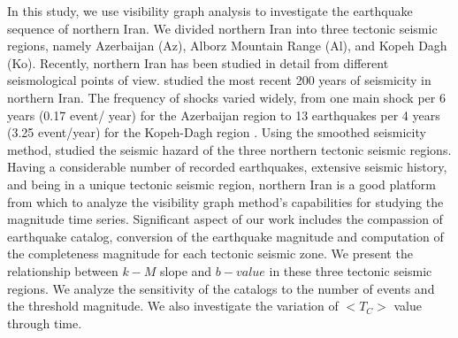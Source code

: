 In this study, we use visibility graph analysis to investigate the earthquake sequence of northern Iran. We divided northern Iran into three tectonic seismic regions, namely Azerbaijan (Az), Alborz Mountain Range (Al), and Kopeh Dagh (Ko).  Recently, northern Iran has been studied in detail from different seismological points of view.  \citet{Nemati2015} studied the most recent 200 years of seismicity in northern Iran. The frequency of shocks varied widely, from one main shock per 6 years (0.17 event/ year) for the Azerbaijan region to 13 earthquakes per 4 years (3.25 event/year) for the Kopeh-Dagh region \citep{Nemati2015}. Using the smoothed seismicity method, \citet{Khoshnevis2016} studied the seismic hazard of the three northern tectonic seismic regions. Having a considerable number of recorded earthquakes, extensive seismic history, and being in a unique tectonic seismic region, northern Iran is a good platform from which to analyze the visibility graph method's capabilities for studying the magnitude time series. Significant aspect of our work includes the compassion of earthquake catalog, conversion of the earthquake magnitude and computation of the completeness magnitude for each tectonic seismic zone. We present the relationship between  $k-M$  slope and $b-value$  in these three tectonic seismic regions. We analyze the sensitivity of the catalogs to the number of events and the threshold magnitude. We also investigate the variation of  $<T_C>$  value through time. 



